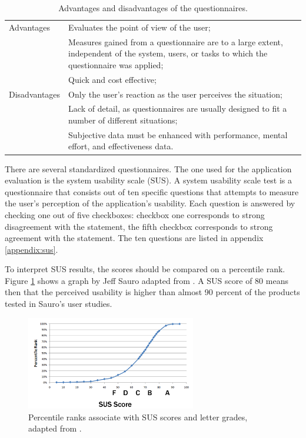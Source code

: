 \begin{table}%
	\begin{center}
		\begin{tabular}{l p{300px}}
			\hline
			Advantages		&		Evaluates the point of view of the user; \\
										&		Measures gained from a questionnaire are to a large extent, independent of the system, users, or tasks to which the questionnaire was applied; \\
										&		Quick and cost effective; \\
			\hline
			Disadvantages	&		Only the user's reaction as the user perceives the situation; \\
										&		Lack of detail, as questionnaires are usually designed to fit a number of different situations; \\
										&		Subjective data must be enhanced with performance, mental effort, and effectiveness data. \\
			\hline
		\end{tabular}
	\end{center}
	\caption{Advantages and disadvantages of the questionnaires.}
	\label{table:questionnaires}
\end{table}


There are several standardized questionnaires. The one used for the application evaluation is the system usability scale (SUS). A system usability scale test is a questionnaire that consists out of ten specific questions that attempts to measure the user's perception of the application's usability. Each question is answered by checking one out of five checkboxes: checkbox one corresponds to strong disagreement with the statement, the fifth checkbox corresponds to strong agreement with the statement\cite{sauro:2011}. The ten questions are listed in appendix \ref{appendix:sus}.

To interpret SUS results, the scores should be compared on a percentile rank. Figure \ref{figure:sus_percentile} shows a graph by Jeff Sauro adapted from \cite{sauro:2011}. A SUS score of 80 means then that the perceived usability is higher than almost 90 percent of the products tested in Sauro's user studies.

\begin{figure}%
	\begin{center}
		\includegraphics[width=280px]{img/sus_curve}%
	\end{center}
	\caption{Percentile ranks associate with SUS scores and letter grades, adapted from \cite{sauro:2011}.}%
	\label{figure:sus_percentile}%
\end{figure}


